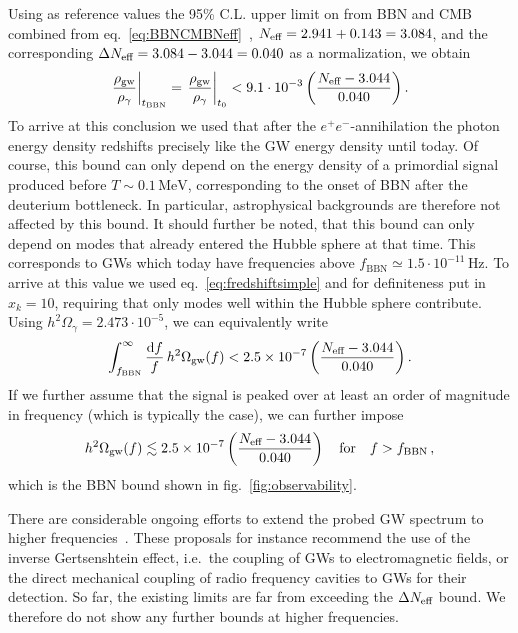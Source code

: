 Using as reference values the 95\% C.L. upper limit on \Neff from \ac{BBN} and \ac{CMB} combined from eq.~\eqref{eq:BBNCMBNeff}~\cite{Yeh:2022heq}, $N_\text{eff} = 2.941 + 0.143 = 3.084$, and the corresponding $\Delta N_\text{eff}  = 3.084-3.044 = 0.040$ as a normalization, we obtain  
\begin{align}
	\left. \frac{\rho_{\text{gw}}}{ \rho_\gamma} \right|_{t_\text{BBN}} = \left. \frac{\rho_{\text{gw}}}{ \rho_\gamma} \right|_{t_0} < 9.1 \cdot 10^{-3} \left( \frac{N_{\text{eff}}-3.044}{0.040} \right) .
\end{align}
To arrive at this conclusion we used that after the $e^{+} e^{-}$-annihilation the photon energy density redshifts precisely like the \ac{GW} energy density until today. Of course, this bound can only depend on the energy density of a primordial signal produced before $T \sim 0.1 \, \text{MeV}$, corresponding to the onset of \ac{BBN} after the deuterium bottleneck. In particular,   astrophysical backgrounds are therefore not affected by this bound. It should further be noted, that this bound can only depend on modes that already entered the Hubble sphere at that time. This corresponds to \acp{GW} which today have frequencies above $f_\text{BBN} \simeq 1.5 \cdot 10^{-11} \, \text{Hz}$. To arrive at this value we used eq.~\eqref{eq:fredshiftsimple} and for definiteness put in $x_k = 10$, requiring that only modes well within the Hubble sphere contribute. Using $h^2 \Omega_\gamma= 2.473 \cdot 10^{-5}$, we can equivalently write
\begin{align}
	\int_{f_{\text{BBN}}}^{\infty} \frac{\mathop{}\!\mathrm{d} f}{f} \,  h^2 \Omega_{\text{gw}}(f)<2.5 \times 10^{-7} \left( \frac{N_\text{eff}-3.044}{0.040} \right).
\end{align}
If we further assume that the signal is peaked  over at least an order of magnitude in frequency (which is typically the case), we can further impose
\begin{align}
	h^2 \Omega_{\text{gw}}(f) \lesssim 2.5 \times 10^{-7} \left( \frac{N_\text{eff}-3.044}{0.040} \right) \quad \text{for} \quad f>f_\text{BBN} \, , \label{eq:NeffboundGW}
\end{align}
which is the \ac{BBN} bound shown in fig.~\ref{fig:observability}. 

There are considerable ongoing   efforts to extend the probed \ac{GW} spectrum to higher frequencies~\cite{Bringmann:2023gba, Berlin:2023grv}.  These proposals for instance recommend the use of the inverse Gertsenshtein effect, i.e.~the coupling of \acp{GW} to electromagnetic fields, or the direct mechanical coupling of radio frequency cavities to \acp{GW} for their detection. So far, the existing limits are far from exceeding the $\Delta N_\text{eff} $ bound. We therefore do not show any further bounds at higher frequencies.

